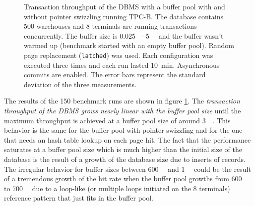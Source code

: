 \begin{@empty}
\begin{figure}[ht!]
{
        }
        \caption{Transaction throughput of the DBMS with a buffer pool with and without pointer swizzling running TPC-B. The database contains 500 warehouses and 8 terminals are running transactions concurrently. The buffer size is \SIrange{0.025}{5}{\gibi\byte} and the buffer wasn't warmed up (benchmark started with an empty buffer pool). Random page replacement (\lstinline{latched}) was used. Each configuration was executed three times and each run lasted \SI{10}{\minute}. Asynchronous commits are enabled. The error bars represent the standard deviation of the three measurements.}
        \label{fig:tpcbperformance}
    \end{figure}
\end{@empty}

    The results of the \num{150} benchmark runs are shown in figure \ref{fig:tpcbperformance}. The \emph{transaction throughput of the DBMS grows nearly linear with the buffer pool size} until the maximum throughput is achieved at a buffer pool size of around \SI{3}{\gibi\byte}. This behavior is the same for the buffer pool with pointer swizzling and for the one that needs an hash table lookup on each page hit. The fact that the performance saturates at a buffer pool size which is much higher than the initial size of the database is the result of a growth of the database size due to inserts of records. The irregular behavior for buffer sizes between \SI{600}{\mebi\byte} and \SI{1}{\gibi\byte} could be the result of a tremendous growth of the hit rate when the buffer pool growths from \SI{600}{\mebi\byte} to \SI{700}{\mebi\byte} due to a loop-like (or multiple loops initiated on the 8 terminals) reference pattern that just fits in the buffer pool.

